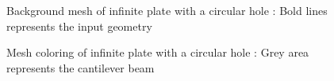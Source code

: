 \begin{figure}
    \centering
    \caption[Background mesh of infinite plate with a circular hole]{Background mesh of infinite plate with a circular hole : Bold lines represents the input geometry}
    \label{qdt_fig:ex_chole_background_mesh}
\end{figure}

\begin{figure}
    \centering
    \caption[Mesh coloring of infinite plate with a circular hole]{Mesh coloring of infinite plate with a circular hole : Grey area represents the cantilever beam}
    \label{qdt_fig:ex_chole_mesh_coloring}
\end{figure}

